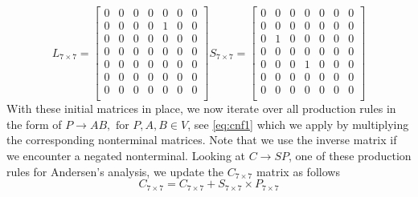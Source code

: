 \[
    L_{7\times 7} = 
    \begin{bmatrix}
        0 & 0 & 0 & 0 & 0 & 0 & 0 \\
        0 & 0 & 0 & 0 & 1 & 0 & 0 \\
        0 & 0 & 0 & 0 & 0 & 0 & 0 \\
        0 & 0 & 0 & 0 & 0 & 0 & 0 \\
        0 & 0 & 0 & 0 & 0 & 0 & 0 \\
        0 & 0 & 0 & 0 & 0 & 0 & 0 \\
        0 & 0 & 0 & 0 & 0 & 0 & 0 \\
    \end{bmatrix}
    S_{7\times 7} = 
    \begin{bmatrix}
        0 & 0 & 0 & 0 & 0 & 0 & 0 \\
        0 & 0 & 0 & 0 & 0 & 0 & 0 \\
        0 & 1 & 0 & 0 & 0 & 0 & 0 \\
        0 & 0 & 0 & 0 & 0 & 0 & 0 \\
        0 & 0 & 0 & 1 & 0 & 0 & 0 \\
        0 & 0 & 0 & 0 & 0 & 0 & 0 \\
        0 & 0 & 0 & 0 & 0 & 0 & 0 \\
    \end{bmatrix}
\]
With these initial matrices in place, we now iterate over all production rules in the form of $P\rightarrow AB, \textrm{ for } P,A,B \in V$, see \autoref{eq:cnf1} which we apply by multiplying the corresponding nonterminal matrices. Note that we use the inverse matrix if we encounter a negated nonterminal. Looking at $C\rightarrow SP$, one of these production rules for Andersen's analysis, we update the $C_{7\times 7}$ matrix as follows $$C_{7\times 7} = C_{7\times 7} + S_{7\times 7} \times P_{7\times 7}$$
